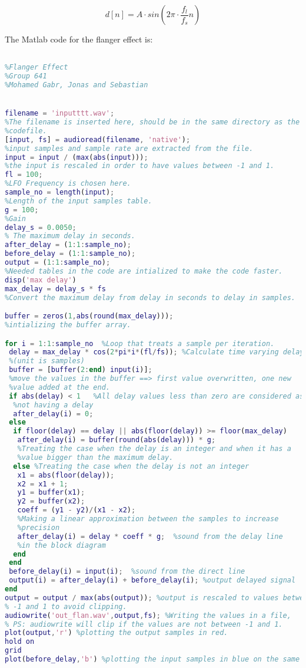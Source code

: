\begin{equation}
	d[n]= A \cdot sin(2\pi  \cdot \frac{f_{l}}{f_{s}} n)
\end{equation}

\startexplain
    \stopexplain 

The Matlab code for the flanger effect is:

\begin{lstlisting}[language=Matlab, caption= Matlab code for flanger effect]

%Flanger Effect
%Group 641
%Mohamed Gabr, Jonas and Sebastian


filename = 'inputttt.wav'; 
%The filename is inserted here, should be in the same directory as the
%codefile.
[input, fs] = audioread(filename, 'native');
%input samples and sample rate are extracted from the file.
input = input / (max(abs(input)));
%the input is rescaled in order to have values between -1 and 1. 
fl = 100;  
%LFO Frequency is chosen here.
sample_no = length(input); 
%Length of the input samples table.
g = 100; 
%Gain
delay_s = 0.0050; 
% The maximum delay in seconds.
after_delay = (1:1:sample_no); 
before_delay = (1:1:sample_no);
output = (1:1:sample_no);
%Needed tables in the code are intialized to make the code faster.
disp('max delay')
max_delay = delay_s * fs  
%Convert the maximum delay from delay in seconds to delay in samples.

buffer = zeros(1,abs(round(max_delay))); 
%intializing the buffer array.

for i = 1:1:sample_no  %Loop that treats a sample per iteration. 
 delay = max_delay * cos(2*pi*i*(fl/fs)); %Calculate time varying delay 
 %(unit is samples)
 buffer = [buffer(2:end) input(i)]; 
 %move the values in the buffer ==> first value overwritten, one new 
 %value added at the end.
 if abs(delay) < 1   %All delay values less than zero are considered as
  %not having a delay
  after_delay(i) = 0;
 else
  if floor(delay) == delay || abs(floor(delay)) >= floor(max_delay)
   after_delay(i) = buffer(round(abs(delay))) * g;
   %Treating the case when the delay is an integer and when it has a
   %value bigger than the maximum delay. 
  else %Treating the case when the delay is not an integer
   x1 = abs(floor(delay));
   x2 = x1 + 1;
   y1 = buffer(x1);
   y2 = buffer(x2);
   coeff = (y1 - y2)/(x1 - x2);
   %Making a linear approximation between the samples to increase
   %precision
   after_delay(i) = delay * coeff * g;  %sound from the delay line
   %in the block diagram 
  end
 end
 before_delay(i) = input(i);  %sound from the direct line
 output(i) = after_delay(i) + before_delay(i); %output delayed signal 
end
output = output / max(abs(output)); %output is rescaled to values between
% -1 and 1 to avoid clipping. 
audiowrite('out_flan.wav',output,fs); %Writing the values in a file, 
% PS: audiowrite will clip if the values are not between -1 and 1. 
plot(output,'r') %plotting the output samples in red.
hold on
grid
plot(before_delay,'b') %plotting the input samples in blue on the same fig.





\end{lstlisting}
